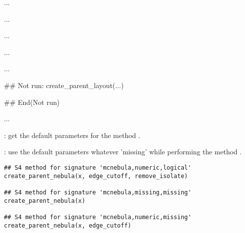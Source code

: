 \documentclass[letterpaper]{book}
\begin{document}
%
\begin{Arguments}
\begin{ldescription}
\item[\code{x}] ...

\item[\code{ggraph\_layout}] ...

\item[\code{seed}] ...
\end{ldescription}
\end{Arguments}
%
\begin{Details}\relax
...
\end{Details}
%
\begin{Value}
...
\end{Value}
%
\begin{SeeAlso}\relax
{}
\end{SeeAlso}
%
\begin{Examples}
\begin{ExampleCode}
## Not run: 
create_parent_layout(...)

## End(Not run)
\end{ExampleCode}
\end{Examples}
%
\begin{Description}\relax
...

: get the default parameters for the method
.

: use the default parameters whatever 'missing'
while performing the method .
\end{Description}
%
\begin{Usage}
\begin{verbatim}
## S4 method for signature 'mcnebula,numeric,logical'
create_parent_nebula(x, edge_cutoff, remove_isolate)

## S4 method for signature 'mcnebula,missing,missing'
create_parent_nebula(x)

## S4 method for signature 'mcnebula,numeric,missing'
create_parent_nebula(x, edge_cutoff)
\end{verbatim}
\end{Usage}
\end{document}
